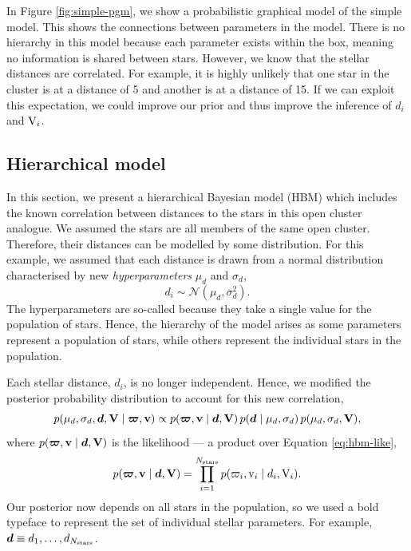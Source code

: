 In Figure \ref{fig:simple-pgm}, we show a probabilistic graphical model of the simple model. This shows the connections between parameters in the model. There is no hierarchy in this model because each parameter exists within the box, meaning no information is shared between stars. However, we know that the stellar distances are correlated. For example, it is highly unlikely that one star in the cluster is at a distance of 5 and another is at a distance of 15. If we can exploit this expectation, we could improve our prior and thus improve the inference of \(d_i\) and \(\mathrm{V}_i\).

\subsection{Hierarchical model}

In this section, we present a hierarchical Bayesian model (HBM) which includes the known correlation between distances to the stars in this open cluster analogue. We assumed the stars are all members of the same open cluster. Therefore, their distances can be modelled by some distribution. For this example, we assumed that each distance is drawn from a normal distribution characterised by new \emph{hyperparameters} \(\mu_d\) and \(\sigma_d\),
%
\begin{equation}
    d_i \sim \mathcal{N}(\mu_d, \sigma_d^2).
\end{equation}
%
The hyperparameters are so-called because they take a single value for the population of stars. Hence, the hierarchy of the model arises as some parameters represent a population of stars, while others represent the individual stars in the population.

Each stellar distance, \(d_i\), is no longer independent. Hence, we modified the posterior probability distribution to account for this new correlation,
%
\begin{equation}
    p(\mu_d, \sigma_d, \bm{d}, \bm{\mathrm{V}} \mid \bm{\varpi}, \bm{\mathrm{v}}) \propto p(\bm{\varpi}, \bm{\mathrm{v}} \mid \bm{d}, \bm{\mathrm{V}}) \, p(\bm{d} \mid \mu_d, \sigma_d) \, p(\mu_d, \sigma_d, \bm{\mathrm{V}}),
\end{equation}
%
where \(p(\bm{\varpi}, \bm{\mathrm{v}} \mid \bm{d}, \bm{\mathrm{V}})\) is the likelihood --- a product over Equation \ref{eq:hbm-like},
%
\begin{equation}
    p(\bm{\varpi}, \bm{\mathrm{v}} \mid \bm{d}, \bm{\mathrm{V}}) = \prod_{i=1}^{N_\mathrm{stars}} p(\varpi_i, \mathrm{v}_i \mid d_i, \mathrm{V}_i).
\end{equation}
%
Our posterior now depends on all stars in the population, so we used a bold typeface to represent the set of individual stellar parameters. For example, \(\bm{d} \equiv d_1, \dots, d_{N_\mathrm{stars}}\).

